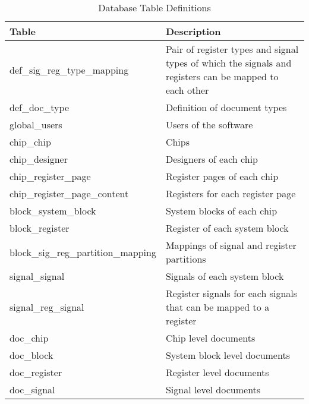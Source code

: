 \begin{table}[htbp]
\centering
\caption {Database Table Definitions} \label{tab:Database Table Definitions}
\begin{tabular}{ll}
\hline
Table & Description \\
\hline
def\_sig\_reg\_type\_mapping & Pair of register types and signal types of which the signals and registers can be mapped to each other \\
def\_doc\_type & Definition of document types \\
global\_users & Users of the software \\
chip\_chip & Chips \\
chip\_designer & Designers of each chip \\
chip\_register\_page & Register pages of each chip \\
chip\_register\_page\_content & Registers for each register page \\
block\_system\_block & System blocks of each chip \\
block\_register & Register of each system block \\
block\_sig\_reg\_partition\_mapping & Mappings of signal and register partitions \\
signal\_signal & Signals of each system block \\
signal\_reg\_signal & Register signals for each signals that can be mapped to a register \\
doc\_chip & Chip level documents \\
doc\_block & System block level documents \\
doc\_register & Register level documents \\
doc\_signal & Signal level documents \\
\hline
\end{tabular}
\end{table}